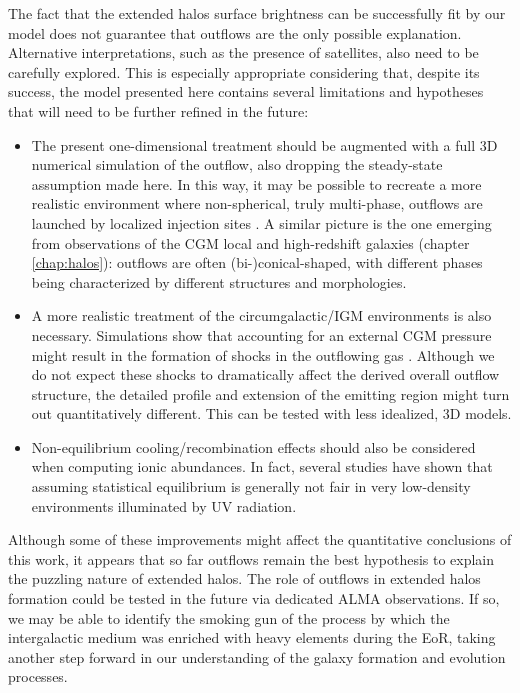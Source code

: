 The fact that the extended \CII halos surface brightness can be successfully fit by our model does not guarantee that outflows are the only possible explanation. Alternative interpretations, such as the presence of satellites, also need to be carefully explored. This is especially appropriate considering that, despite its success, the model presented here contains several limitations and hypotheses that will need to be further refined in the future:
\begin{itemize}
    \item The present one-dimensional treatment should be augmented with a full 3D numerical simulation of the outflow, also dropping the steady-state assumption made here. In this way, it may be possible to recreate a more realistic environment where non-spherical, truly multi-phase, outflows are launched by localized injection sites \citep{schneider2018production}. A similar picture is the one emerging from observations of the CGM local and high-redshift galaxies (chapter \ref{chap:halos}): outflows are often (bi-)conical-shaped, with different phases being characterized by different structures and morphologies. 
    \item A more realistic treatment of the circumgalactic/IGM environments is also necessary. Simulations show that accounting for an external CGM pressure might result in the formation of shocks in the outflowing gas \citep{samui:2008, Lochaas:2020, gray2019catastrophic}. Although we do not expect these shocks to dramatically affect the derived overall outflow structure, the detailed profile and extension of the \CII emitting region might turn out quantitatively different. This can be tested with less idealized, 3D models.
    \item Non-equilibrium cooling/recombination effects should also be considered when computing ionic abundances. In fact, several studies \citep[e.g.,][]{oppenheimer&schaye} have shown that assuming statistical equilibrium is generally not fair in very low-density environments illuminated by UV radiation.
\end{itemize}


Although some of these improvements might affect the quantitative conclusions of this work, it appears that so far outflows remain the best hypothesis to explain the puzzling nature of extended \CII halos. The role of outflows in extended halos formation could be tested in the future via dedicated ALMA observations. If so, we may be able to identify the smoking gun of the process by which the intergalactic medium was enriched with heavy elements during the EoR, taking another step forward in our understanding of the galaxy formation and evolution processes. 

